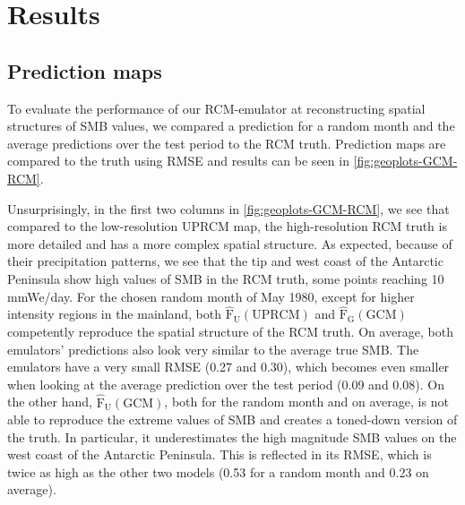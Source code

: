 \documentclass[a4paper,11pt,oneside]{report}
\begin{document}

\chapter{Results}

\section{Prediction maps}\label{subsec:geoplots}
To evaluate the performance of our RCM-emulator at reconstructing spatial structures of SMB values, we compared a prediction for a random month and the average predictions over the test period to the RCM truth. Prediction maps are compared to the truth using RMSE and results can be seen in \autoref{fig:geoplots-GCM-RCM}. 

Unsurprisingly, in the first two columns in \autoref{fig:geoplots-GCM-RCM}, we see that compared to the low-resolution UPRCM map, the high-resolution RCM truth is more detailed and has a more complex spatial structure. As expected, because of their precipitation patterns, we see that the tip and west coast of the Antarctic Peninsula show high values of SMB in the RCM truth, some points reaching 10 \si{mmWe/day}. For the chosen random month of May 1980, except for higher intensity regions in the mainland, both $\mathrm{\hat{F}_{U}(UPRCM)}$ and $\mathrm{\hat{F}_{G}(GCM)}$ competently reproduce the spatial structure of the RCM truth. On average, both emulators' predictions also look very similar to the average true SMB. The emulators have a very small RMSE (0.27 and 0.30), which becomes even smaller when looking at the average prediction over the test period (0.09 and 0.08). On the other hand, $\mathrm{\hat{F}_{U}(GCM)}$, both for the random month and on average, is not able to reproduce the extreme values of SMB and creates a toned-down version of the truth. In particular, it underestimates the high magnitude SMB values on the west coast of the Antarctic Peninsula. This is reflected in its RMSE, which is twice as high as the other two models (0.53 for a random month and 0.23 on average). 
\end{document}
